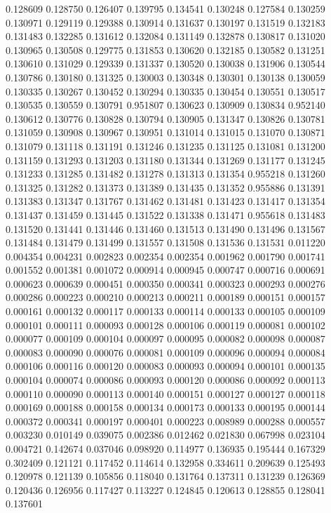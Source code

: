 0.128609
0.128750
0.126407
0.139795
0.134541
0.130248
0.127584
0.130259
0.130971
0.129119
0.129388
0.130914
0.131637
0.130197
0.131519
0.132183
0.131483
0.132285
0.131612
0.132084
0.131149
0.132878
0.130817
0.131020
0.130965
0.130508
0.129775
0.131853
0.130620
0.132185
0.130582
0.131251
0.130610
0.131029
0.129339
0.131337
0.130520
0.130038
0.131906
0.130544
0.130786
0.130180
0.131325
0.130003
0.130348
0.130301
0.130138
0.130059
0.130335
0.130267
0.130452
0.130294
0.130335
0.130454
0.130551
0.130517
0.130535
0.130559
0.130791
0.951807
0.130623
0.130909
0.130834
0.952140
0.130612
0.130776
0.130828
0.130794
0.130905
0.131347
0.130826
0.130781
0.131059
0.130908
0.130967
0.130951
0.131014
0.131015
0.131070
0.130871
0.131079
0.131118
0.131191
0.131246
0.131235
0.131125
0.131081
0.131200
0.131159
0.131293
0.131203
0.131180
0.131344
0.131269
0.131177
0.131245
0.131233
0.131285
0.131482
0.131278
0.131313
0.131354
0.955218
0.131260
0.131325
0.131282
0.131373
0.131389
0.131435
0.131352
0.955886
0.131391
0.131383
0.131347
0.131767
0.131462
0.131481
0.131423
0.131417
0.131354
0.131437
0.131459
0.131445
0.131522
0.131338
0.131471
0.955618
0.131483
0.131520
0.131441
0.131446
0.131460
0.131513
0.131490
0.131496
0.131567
0.131484
0.131479
0.131499
0.131557
0.131508
0.131536
0.131531
0.011220
0.004354
0.004231
0.002823
0.002354
0.002354
0.001962
0.001790
0.001741
0.001552
0.001381
0.001072
0.000914
0.000945
0.000747
0.000716
0.000691
0.000623
0.000639
0.000451
0.000350
0.000341
0.000323
0.000293
0.000276
0.000286
0.000223
0.000210
0.000213
0.000211
0.000189
0.000151
0.000157
0.000161
0.000132
0.000117
0.000133
0.000114
0.000133
0.000105
0.000109
0.000101
0.000111
0.000093
0.000128
0.000106
0.000119
0.000081
0.000102
0.000077
0.000109
0.000104
0.000097
0.000095
0.000082
0.000098
0.000087
0.000083
0.000090
0.000076
0.000081
0.000109
0.000096
0.000094
0.000084
0.000106
0.000116
0.000120
0.000083
0.000093
0.000094
0.000101
0.000135
0.000104
0.000074
0.000086
0.000093
0.000120
0.000086
0.000092
0.000113
0.000110
0.000090
0.000113
0.000140
0.000151
0.000127
0.000127
0.000118
0.000169
0.000188
0.000158
0.000134
0.000173
0.000133
0.000195
0.000144
0.000372
0.000341
0.000197
0.000401
0.000223
0.008989
0.000288
0.000557
0.003230
0.010149
0.039075
0.002386
0.012462
0.021830
0.067998
0.023104
0.004721
0.142674
0.037046
0.098920
0.114977
0.136935
0.195444
0.167329
0.302409
0.121121
0.117452
0.114614
0.132958
0.334611
0.209639
0.125493
0.120978
0.121139
0.105856
0.118040
0.131764
0.137311
0.131239
0.126369
0.120436
0.126956
0.117427
0.113227
0.124845
0.120613
0.128855
0.128041
0.137601
